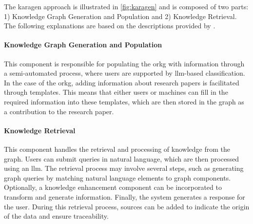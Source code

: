 The \gls{karagen} approach is illustrated in \autoref{fig:karagen} and is composed of two parts: 1) Knowledge Graph Generation and Population and 2) Knowledge Retrieval. The following explanations are based on the descriptions provided by \textcite{kaplan_combining_2024}.

\paragraph{Knowledge Graph Generation and Population} This component is responsible for populating the \gls{orkg} with information through a semi-automated process, where users are supported by \gls{llm}-based classification. In the case of the \gls{orkg}, adding information about research papers is facilitated through templates. This means that either users or machines can fill in the required information into these templates, which are then stored in the graph as a contribution to the research paper.

\paragraph{Knowledge Retrieval} This component handles the retrieval and processing of knowledge from the graph. Users can submit queries in natural language, which are then processed using an \gls{llm}. The retrieval process may involve several steps, such as generating graph queries by matching natural language elements to graph components. Optionally, a knowledge enhancement component can be incorporated to transform and generate information. Finally, the system generates a response for the user. During this retrieval process, sources can be added to indicate the origin of the data and ensure traceability.



